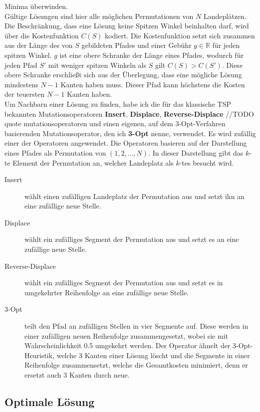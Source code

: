 \documentclass[a4paper,10pt,ngerman]{scrartcl}
\begin{document}
Minima überwinden.\\
Gültige Lösungen sind hier alle möglichen Permutationen von $N$ Landeplätzen. Die Beschränkung, dass eine
Lösung keine Spitzen Winkel beinhalten darf, wird über die Kostenfunktion $C(S)$ kodiert. Die Kostenfunktion
setzt sich zusammen aus der Länge des von $S$ gebildeten Pfades und einer Gebühr $g \in \mathbb{R}$ für jeden spitzen Winkel. $g$
ist eine obere Schranke der Länge eines Pfades, wodurch für jeden Pfad $S'$ mit weniger spitzen Winkeln als $S$
gilt $C(S) > C(S')$. Diese obere Schranke erschließt sich aus der Überlegung, dass eine mögliche Lösung mindestens $N-1$ Kanten haben muss.
Dieser Pfad kann höchstens die Kosten der teuersten $N-1$ Kanten haben. \\
Um Nachbarn einer Lösung zu finden, habe ich die für das klassische TSP bekannten Mutationsoperatoren \textbf{Insert}, \textbf{Displace}, \textbf{Reverse-Displace}
//TODO quote mutationsoperatoren
und einen eigenen, auf dem 3-Opt-Verfahren basierenden Mutationsoperator, den ich \textbf{3-Opt} nenne, verwendet. Es wird zufällig einer der Operatoren angewendet.
Die Operatoren basieren auf der
Darstellung eines Pfades als Permutation von $(1, 2, \ldots, N)$. In dieser Darstellung gibt das $k$-te Element der Permutation
an, welcher Landeplatz als $k$-tes besucht wird.
\begin{description}
  \item[Insert] wählt einen zufälligen Landeplatz der Permutation aus und setzt ihn an
    eine zufällige neue Stelle.
  \item[Displace] wählt ein zufälliges Segment der Permutation aus und setzt es an eine
    zufällige neue Stelle.
  \item[Reverse-Displace] wählt ein zufälliges Segment der Permutation aus und setzt es
    in umgekehrter Reihenfolge an eine zufällige neue Stelle.
  \item[3-Opt] teilt den Pfad an zufälligen Stellen in vier Segmente auf. Diese werden
    in einer zufälligen neuen Reihenfolge zusammengesetzt, wobei sie mit Wahrscheinlichkeit
    0.5 umgekehrt werden. Der Operator ähnelt der 3-Opt-Heuristik, welche 3 Kanten einer
    Lösung löscht und die Segmente in einer Reihenfolge zusammensetzt, welche die Gesamtkosten
    minimiert, denn er ersetzt auch 3 Kanten durch neue.
\end{description}
\subsection{Optimale Lösung}
\end{document}
